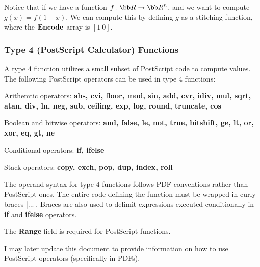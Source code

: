 Notice that if we have a function $f\colon{\bb R}\to{\bb R}^n$, and we want to compute $g(x)=f(1-x)$.
We can compute this by defining $g$ as a stitching function, where the ${\bf Encode}$ array is $[1\ 0]$.

\subsubsection{Type 4 (PostScript Calculator) Functions}

A type 4 function utilizes a small subset of PostScript code to compute values.
The following PostScript operators can be used in type 4 functions:

\blist
    \item Arithemtic operators: {\bf abs, cvi, floor, mod, sin, add, cvr, idiv, mul, sqrt, atan, div, ln,
        neg, sub, ceiling, exp, log, round, truncate, cos}
    \item Boolean and bitwise operators: {\bf and, false, le, not, true, bitshift, ge, lt, or, xor, eq, gt, ne}
    \item Conditional operators: {\bf if, ifelse}
    \item Stack operators: {\bf copy, exch, pop, dup, index, roll}
\elist

The operand syntax for type 4 functions follows PDF conventions rather than PostScript ones.
The entire code defining the function must be wrapped in curly braces \inlinecode|{...}|.
Braces are also used to delimit expressions executed conditionally in {\bf if} and {\bf ifelse} operators.

The {\bf Range} field is required for PostScript functions.

I may later update this document to provide information on how to use PostScript operators (specifically in
PDFs).

